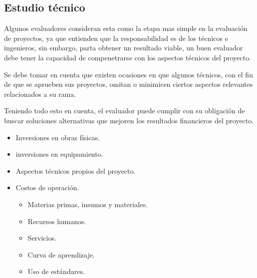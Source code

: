 \documentclass{templateNote}
\begin{document}
\subsection*{Estudio técnico}
Algunos evaluadores consideran esta como la etapa mas simple en la evaluación de proyectos, ya que entienden que la responsabilidad es de los técnicos e ingenieros, sin embargo, parta obtener un resultado viable, un buen evaluador debe tener la capacidad de compenetrarse con los aspectos técnicos del proyecto.

Se debe tomar en cuenta que existen ocasiones en que algunos técnicos, con el fin de que se aprueben sus proyectos, omitan o minimicen ciertos aspectos relevantes relacionados a su rama.

Teniendo todo esto en cuenta, el evaluador puede cumplir con su obligación de buscar soluciones alternativas que mejoren los resultados financieros del proyecto.
\begin{itemize}
    \item Inversiones en obras físicas.
    \item inversiones en equipamiento.
    \item Aspectos técnicos propios del proyecto.
    \item Costos de operación.
    \begin{itemize}
        \item Materias primas, insumos y materiales.
        \item Recursos humanos.
        \item Servicios.
        \item Curva de aprendizaje.
        \item Uso de estándares.
    \end{itemize}
\end{itemize}
\end{document}
